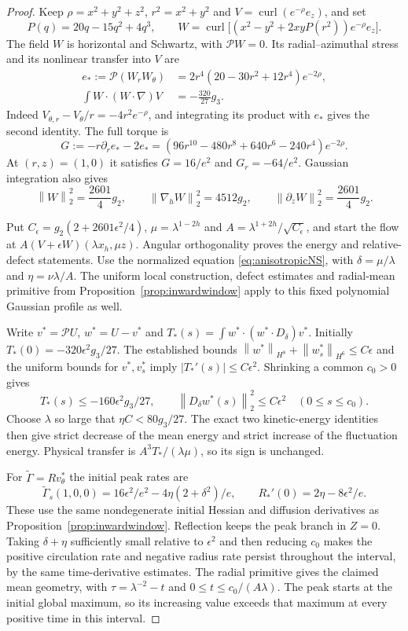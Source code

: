 \documentclass[11pt]{article}
\theoremstyle{remark}
\newcommand{\PP}{\mathcal P}
\newcommand{\norm}[1]{\left\lVert#1\right\rVert}
\newcommand{\curl}{\operatorname{curl}}
\begin{document}
\begin{proof}
Keep $\rho=x^2+y^2+z^2$, $r^2=x^2+y^2$ and
$V=\curl(e^{-\rho}e_z)$, and set
\[
 P(q)=20q-15q^2+4q^3,\qquad
 W=\curl\big[(x^2-y^2+2xyP(r^2))e^{-\rho}e_z\big].
\]
The field $W$ is horizontal and Schwartz, with $\PP W=0$.
Its radial--azimuthal stress and its nonlinear transfer into $V$ are
\begin{align*}
 e_*:=\PP(W_rW_\theta)&=2r^4(20-30r^2+12r^4)e^{-2\rho},\\
 \int W\cdot(W\cdot\nabla)V&=-\frac{320}{27}g_3.
\end{align*}
Indeed $V_{\theta,r}-V_\theta/r=-4r^2e^{-\rho}$, and integrating
its product with $e_*$ gives the second identity. The full torque is
\[
 G:=-r\partial_r e_*-2e_*
   =(96r^{10}-480r^8+640r^6-240r^4)e^{-2\rho}.
\]
At $(r,z)=(1,0)$ it satisfies $G=16/e^2$ and $G_r=-64/e^2$.
Gaussian integration also gives
\[
 \norm W_2^2=\frac{2601}{4}g_2,\qquad
 \norm{\nabla_hW}_2^2=4512g_2,\qquad
 \norm{\partial_zW}_2^2=\frac{2601}{4}g_2.
\]

Put $C_\epsilon=g_2(2+2601\epsilon^2/4)$,
$\mu=\lambda^{1-2h}$ and $A=\lambda^{1+2h}/\sqrt{C_\epsilon}$,
and start the flow at $A(V+\epsilon W)(\lambda x_h,\mu z)$.
Angular orthogonality proves the energy and relative-defect statements.
Use the normalized equation \eqref{eq:anisotropicNS}, with
$\delta=\mu/\lambda$ and $\eta=\nu\lambda/A$.
The uniform local construction, defect estimates and radial-mean
primitive from Proposition~\ref{prop:inwardwindow} apply to this
fixed polynomial Gaussian profile as well.

Write $v^*=\PP U$, $w^*=U-v^*$ and
$T_*(s)=\int w^*\cdot(w^*\cdot D_\delta)v^*$.
Initially $T_*(0)=-320\epsilon^2g_3/27$. The established bounds
$\norm{w^*}_{H^8}+\norm{w^*_s}_{H^6}\leq C\epsilon$ and the
uniform bounds for $v^*,v^*_s$ imply
$|T_*'(s)|\leq C\epsilon^2$. Shrinking a common $c_0>0$ gives
\[
 T_*(s)\leq-160\epsilon^2g_3/27,\qquad
 \norm{D_\delta w^*(s)}_2^2\leq C\epsilon^2
                         \quad(0\leq s\leq c_0).
\]
Choose $\lambda$ so large that $\eta C<80g_3/27$.
The exact two kinetic-energy identities then give strict decrease
of the mean energy and strict increase of the fluctuation energy.
Physical transfer is $A^3T_*/(\lambda\mu)$, so its sign is unchanged.

For $\widetilde\Gamma=R v^*_\theta$ the initial peak rates are
\[
 \widetilde\Gamma_s(1,0,0)
       =16\epsilon^2/e^2-4\eta(2+\delta^2)/e,\qquad
 R_*'(0)=2\eta-8\epsilon^2/e.
\]
These use the same nondegenerate initial Hessian and diffusion
derivatives as Proposition~\ref{prop:inwardwindow}.
Reflection keeps the peak branch in $Z=0$.
Taking $\delta+\eta$ sufficiently small relative to $\epsilon^2$
and then reducing $c_0$ makes the positive circulation rate and
negative radius rate persist throughout the interval, by the
same time-derivative estimates. The radial primitive gives the
claimed mean geometry, with $\tau=\lambda^{-2}-t$ and
$0\leq t\leq c_0/(A\lambda)$. The peak starts at the initial
global maximum, so its increasing value exceeds that maximum
at every positive time in this interval.
\end{proof}
\end{document}
